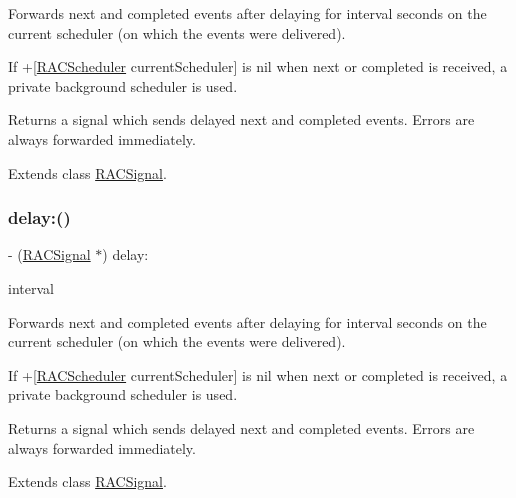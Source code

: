 Forwards {\ttfamily next} and {\ttfamily completed} events after delaying for {\ttfamily interval} seconds on the current scheduler (on which the events were delivered).

If +\mbox{[}\mbox{\hyperlink{interface_r_a_c_scheduler}{R\+A\+C\+Scheduler}} current\+Scheduler\mbox{]} is nil when {\ttfamily next} or {\ttfamily completed} is received, a private background scheduler is used.

Returns a signal which sends delayed {\ttfamily next} and {\ttfamily completed} events. Errors are always forwarded immediately. 

Extends class \mbox{\hyperlink{interface_r_a_c_signal_adc28e5c64d2e6ec8c5ab8465fa6c89b4}{R\+A\+C\+Signal}}.

\mbox{\label{category_r_a_c_signal_07_operations_08_adc28e5c64d2e6ec8c5ab8465fa6c89b4}} 
\subsubsection{\texorpdfstring{delay\+:()}{delay:()}\hspace{0.1cm}{\footnotesize\ttfamily [2/3]}}
{\footnotesize\ttfamily -\/ (\mbox{\hyperlink{interface_r_a_c_signal}{R\+A\+C\+Signal}} $\ast$) delay\+: \begin{DoxyParamCaption}\item[{(N\+S\+Time\+Interval)}]{interval }\end{DoxyParamCaption}}

Forwards {\ttfamily next} and {\ttfamily completed} events after delaying for {\ttfamily interval} seconds on the current scheduler (on which the events were delivered).

If +\mbox{[}\mbox{\hyperlink{interface_r_a_c_scheduler}{R\+A\+C\+Scheduler}} current\+Scheduler\mbox{]} is nil when {\ttfamily next} or {\ttfamily completed} is received, a private background scheduler is used.

Returns a signal which sends delayed {\ttfamily next} and {\ttfamily completed} events. Errors are always forwarded immediately. 

Extends class \mbox{\hyperlink{interface_r_a_c_signal_adc28e5c64d2e6ec8c5ab8465fa6c89b4}{R\+A\+C\+Signal}}.

\mbox{\label{category_r_a_c_signal_07_operations_08_adc28e5c64d2e6ec8c5ab8465fa6c89b4}} 
